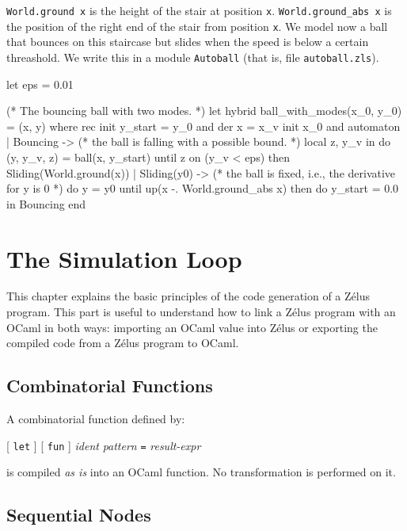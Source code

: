 \documentclass[11pt,titlepage,twoside]{report}
\newcommand{\zelus}{{\sf Z\'elus}}
\newcommand{\ocaml}{{\sf OCaml}}
\newcommand{\term}[1]{{\tt #1}}
\newcommand{\nterm}[1]{{\em #1}}
\begin{document}
\verb-World.ground x- is the height of the stair at position
\verb-x-. \verb-World.ground_abs x- is the position of the right end of the
stair from position \verb-x-. We model now a ball that bounces on this
staircase but slides when the speed is below a certain threashold. We
write this in a module \verb-Autoball- (that is, file
\verb-autoball.zls-).
\begin{chklisting}
let eps = 0.01

(* The bouncing ball with two modes. *)
let hybrid ball_with_modes(x_0, y_0) = (x, y) where
  rec init y_start = y_0 
  and der x = x_v init x_0
  and automaton
      | Bouncing ->
         (* the ball is falling with a possible bound. *)
         local z, y_v in
         do (y, y_v, z) = ball(x, y_start)
         until z on (y_v < eps) then Sliding(World.ground(x))
      | Sliding(y0) ->
         (* the ball is fixed, i.e., the derivative for y is 0 *)
         do 
           y = y0 
         until up(x -. World.ground_abs x)
         then do y_start = 0.0 in Bouncing
      end
\end{chklisting}

\chapter{The Simulation Loop\label{simulation-loop}} %

This chapter explains the basic principles of the code generation of a \zelus{}
program. This part is useful to understand how to link a \zelus{} program
with an \ocaml{} in both ways: importing an \ocaml{} value into \zelus{}
or exporting the compiled code from a \zelus{} program to \ocaml.

\section{Combinatorial Functions\label{combfuncs}} %

A combinatorial function defined by:
\begin{center}
  [ \term{let} ] [ \term{fun} ] \nterm{ident} \nterm{pattern} \term{=}
  \nterm{result-expr}
\end{center}

is compiled \emph{as is} into an \ocaml{} function. No transformation is
performed on it.

\section{Sequential Nodes\label{seqnodes}} %
\end{document}

